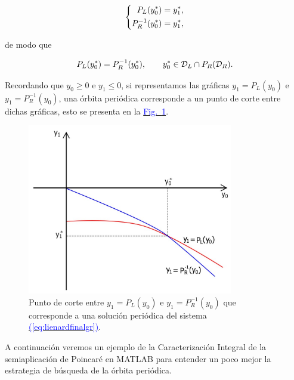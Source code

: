 \documentclass[12pt,a4paper]{report} %
\newcommand{\fref}[1]{\hyperref[#1]{\textcolor{blue}{Fig.~\ref*{#1}}}}
\newcommand{\eref}[1]{\hyperref[#1]{\textcolor{blue}{(\ref*{#1})}}}
\begin{document}
	\begin{equation*}
		\label{eq:ej2}
		\scalebox{1}{$\displaystyle
			\left\{
			\begin{aligned}
				P_L(y_0^*)=y_1^*, \\
				P_R^{-1}(y_0^*)=y_1^*,
			\end{aligned}
			\right. 
			$}
	\end{equation*}\smallskip
	
	\noindent de modo que
	
	\begin{equation*}
		\scalebox{1}{$\displaystyle
		P_L(y_0^*)=P_R^{-1}(y_0^*), \qquad 	y_0^* \in \mathcal{D}_L \cap P_R(\mathcal{D}_R).
		$}
	\end{equation*}\smallskip
	
	
	\noindent Recordando que $y_0\geq0$ e $y_1\leq0$, si representamos las gráficas $y_1=P_L(y_0)$ e $y_1=P_R^{-1}(y_0)$, una órbita periódica corresponde a un punto de corte entre dichas gráficas, esto se presenta en la \fref{fig:graficaejemplo}.
	
	\begin{figure}[h]
		\centering
		\includegraphics[width=0.8\textwidth]{graficaejemplo.jpg}
		\caption{Punto de corte entre $y_1=P_L(y_0)$ e $y_1=P_R^{-1}(y_0)$ que corresponde a una solución periódica del sistema \eref{eq:lienardfinalgr}.}
		\label{fig:graficaejemplo}
	\end{figure}\smallskip
	
	\newpage
	
	\vspace{0.5cm} A continuación veremos un ejemplo de la Caracterización Integral de la semiaplicación de Poincaré en MATLAB para entender un poco mejor la estrategia de búsqueda de la órbita periódica.
	
\end{document}
